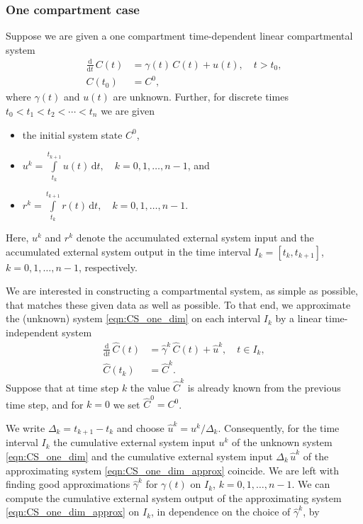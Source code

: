 \documentclass[draft]{agujournal2019}
\newcommand{\deriv}[1]{\frac{\mathrm{d}}{\mathrm{d}#1}}
\newcommand{\dd}[1]{\,\mathrm{d}#1}
\newcommand{\intl}{\int\limits}
\begin{document}
    \subsubsection{One compartment case}
        Suppose we are given a one compartment time-dependent linear compartmental system
        \begin{equation}\label{eqn:CS_one_dim}
            \begin{aligned}
                \deriv{t}\,C(t) &= \gamma(t)\,C(t) + u(t),\quad t>t_0,\\
                C(t_0) &= C^0,
            \end{aligned}
        \end{equation}
        where $\gamma(t)$ and $u(t)$ are unknown.
        Further, for discrete times $t_0<t_1<t_2<\cdots<t_n$ we are given
         \begin{itemize} 
            \item the initial system state $C^0$,
            \item $u^k = \intl_{t_k}^{t_{k+1}} u(t)\dd{t},\quad k=0,1,\ldots,n-1$, and
            \item $r^k = \intl_{t_k}^{t_{k+1}} r(t)\dd{t},\quad k=0,1,\ldots,n-1$.
         \end{itemize} 
        Here, $u^k$ and $r^k$ denote the accumulated external system input and the accumulated external system output in the time interval $I_k=[t_k,t_{k+1}]$, $k=0,1,\ldots,n-1$, respectively.

        We are interested in constructing a compartmental system, as simple as possible, that matches these given data as well as possible.
        To that end, we approximate the (unknown) system \eqref{eqn:CS_one_dim} on each interval $I_k$ by a linear time-independent system
        \begin{equation}\label{eqn:CS_one_dim_approx}
            \begin{aligned}
                \deriv{t}\,\widehat{C}(t) &= \widehat{\gamma}^k\,\widehat{C}(t) + \widehat{u}^k,\quad t\in I_k,\\
                \widehat{C}(t_k) &= \widehat{C}^k.
            \end{aligned}
        \end{equation}
        Suppose that at time step $k$ the value $\widehat{C}^k$ is already known from the previous time step,
        and for $k=0$ we set $\widehat{C}^0=C^0$.

        We write $\Delta_k=t_{k+1}-t_k$ and choose $\widehat{u}^k=u^k/\Delta_k$.
        Consequently, for the time interval $I_k$ the cumulative external system input $u^k$ of the unknown system \eqref{eqn:CS_one_dim} and the cumulative external system input $\Delta_k\,\widehat{u}^k$ of the approximating system \eqref{eqn:CS_one_dim_approx} coincide.
        We are left with finding good approximations $\widehat{\gamma}^k$ for $\gamma(t)$ on $I_k$, $k=0,1,\ldots,n-1$.
        We can compute the cumulative external system output of the approximating system \eqref{eqn:CS_one_dim_approx} on $I_k$, in dependence on the choice of $\widehat{\gamma}^k$, by
\end{document}
